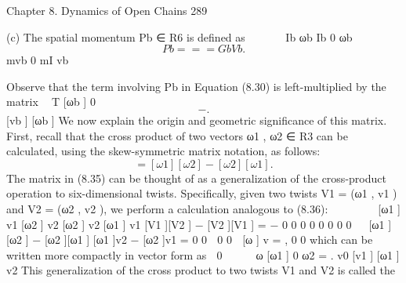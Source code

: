 \documentclass[12pt,a4paper]{article}
\begin{document}
Chapter 8. Dynamics of Open Chains                                                                  289

  (c) The spatial momentum Pb ∈ R6 is defined as
                                             
                         Ib ωb     Ib 0        ωb
\begin{equation}
Pb =          =                   = Gb Vb .
\label{eq:8.34}
\end{equation}
                         mvb       0 mI        vb

   Observe that the term involving Pb in Equation (8.30) is left-multiplied by
the matrix                                  T
                                 [ωb ]  0
\begin{equation}
−                   .
\label{eq:8.35}
\end{equation}
                                 [vb ] [ωb ]
We now explain the origin and geometric significance of this matrix. First, recall
that the cross product of two vectors ω1 , ω2 ∈ R3 can be calculated, using the
skew-symmetric matrix notation, as follows:
\begin{equation}
[ω1 × ω2 ] = [ω1 ][ω2 ] − [ω2 ][ω1 ].
\label{eq:8.36}
\end{equation}
The matrix in (8.35) can be thought of as a generalization of the cross-product
operation to six-dimensional twists. Specifically, given two twists V1 = (ω1 , v1 )
and V2 = (ω2 , v2 ), we perform a calculation analogous to (8.36):
                                                                             
                            [ω1 ] v1        [ω2 ] v2          [ω2 ] v2     [ω1 ] v1
[V1 ][V2 ] − [V2 ][V1 ] =                                −
                             0      0          0    0           0     0     0    0
                                                                     
                            [ω1 ][ω2 ] − [ω2 ][ω1 ] [ω1 ]v2 − [ω2 ]v1
                        =
                                       0                    0
                           0        0
                                       
                            [ω ] v
                        =                ,
                             0     0
which can be written more compactly in vector form as
                       0                      
                        ω       [ω1 ]   0       ω2
                            =                        .
                        v0      [v1 ] [ω1 ]     v2
This generalization of the cross product to two twists V1 and V2 is called the
\end{document}
